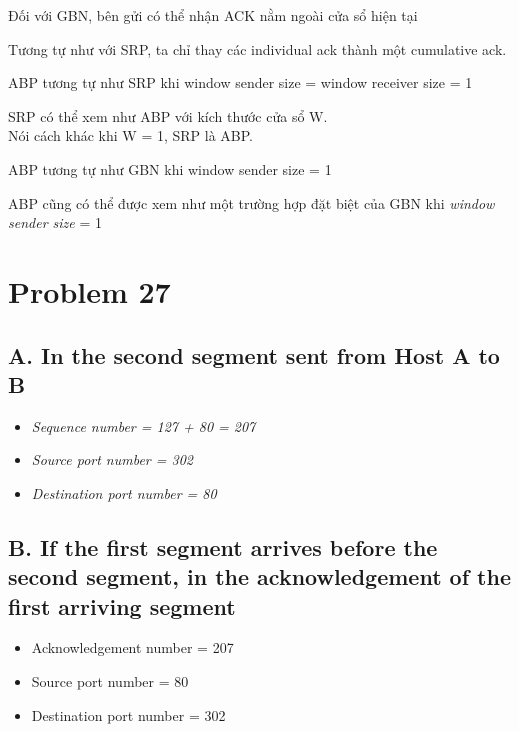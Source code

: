 \documentclass[12pt,a4paper]{article}
\begin{document}
\begin{description}[font=$\bullet$~\normalfont\scshape\color{red!50!black}]
    \item [B True] Đối với GBN, bên gửi có thể nhận ACK nằm ngoài cửa sổ hiện tại
\end{description}
Tương tự như với SRP, ta chỉ thay các individual ack thành một cumulative ack.


\begin{description}[font=$\bullet$~\normalfont\scshape\color{red!50!black}]
    \item [C True] ABP tương tự như SRP khi window sender size = window receiver size = 1
\end{description}
SRP có thể xem như ABP với kích thước cửa sổ W. \\
Nói cách khác khi W = 1, SRP là ABP.
\begin{description}[font=$\bullet$~\normalfont\scshape\color{red!50!black}]
    \item [D True] ABP tương tự như GBN khi window sender size = 1
\end{description}
ABP cũng có thể được xem như một trường hợp đặt biệt của GBN khi \textit{window sender size} = 1


\section*{Problem 27}
\subsection*{A. In the second segment sent from Host A to B}
\begin{itemize}
    \item \textit{Sequence number = 127 + 80 = 207}
    \item \textit{Source port number = 302}
    \item \textit{Destination port number = 80}
\end{itemize}

\subsection*{B. If the first segment arrives before the second segment, in the acknowledgement of the first arriving segment}
\begin{itemize}
    \item Acknowledgement number = 207
    \item Source port number = 80
    \item Destination port number = 302
\end{itemize}
\end{document}
